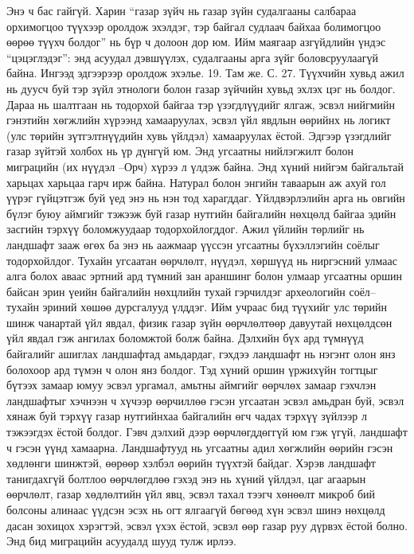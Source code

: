 Энэ ч бас гайгүй. Харин “газар зүйч нь газар зүйн судалгааны салбараа орхимогцоо түүхээр оролдож эхэлдэг, тэр байгал судлаач байхаа болимогцоо өөрөө түүхч болдог” нь бүр ч долоон дор юм. Ийм маягаар азгүйдлийн үндэс “цэцэглэдэг”: энд асуудал дэвшүүлэх, судалгааны арга зүйг боловсруулаагүй байна. Ингээд эдгээрээр оролдож эхэлье. 19. Там же. С. 27.
Түүхчийн хувьд ажил нь дуусч буй тэр зүйл этнологи болон газар зүйчийн хувьд эхлэх цэг нь болдог. Дараа нь шалтгаан нь тодорхой байгаа тэр үзэгдлүүдийг ялгаж, эсвэл нийгмийн гэнэтийн хөгжлийн хүрээнд хамааруулах, эсвэл үйл явдлын өөрийнх нь логикт (улс төрийн зүтгэлтнүүдийн хувь үйлдэл) хамааруулах ёстой. Эдгээр үзэгдлийг газар зүйтэй холбох нь үр дүнгүй юм. Энд угсаатны нийлэгжилт болон миграцийн (их нүүдэл –Орч) хүрээ л үлдэж байна. Энд хүний нийгэм байгальтай харьцах харьцаа гарч ирж байна. Натурал болон энгийн таваарын аж ахуй гол үүрэг гүйцэтгэж буй үед энэ нь нэн тод харагддаг. Үйлдвэрлэлийн арга нь овгийн бүлэг буюу аймгийг тэжээж буй газар нутгийн байгалийн нөхцөлд байгаа эдийн засгийн тэрхүү боломжуудаар тодорхойлогддог.
Ажил үйлийн төрлийг нь ландшафт зааж өгөх ба энэ нь аажмаар үүссэн угсаатны бүхэллэгийн соёлыг тодорхойлдог. Тухайн угсаатан өөрчлөлт, нүүдэл, хөршүүд нь ниргэсний улмаас алга болох аваас эртний ард түмний зан араншинг болон улмаар угсаатны оршин байсан эрин үеийн байгалийн нөхцлийн тухай гэрчилдэг археологийн соёл–тухайн эриний хөшөө дурсгалууд үлддэг. Ийм учраас бид түүхийг улс төрийн шинж чанартай үйл явдал, физик газар зүйн өөрчлөлтөөр давуутай нөхцөлдсөн үйл явдал гэж ангилах боломжтой болж байна.
Дэлхийн бүх ард түмнүүд байгалийг ашиглах ландшафтад амьдардаг, гэхдээ ландшафт нь нэгэнт олон янз болохоор ард түмэн ч олон янз болдог. Тэд хүний оршин үржихүйн тогтцыг бүтээх замаар юмуу эсвэл ургамал, амьтны аймгийг өөрчлөх замаар гэхчлэн ландшафтыг хэчнээн ч хүчээр өөрчиллөө гэсэн угсаатан эсвэл амьдран буй, эсвэл хянаж буй тэрхүү газар нутгийнхаа байгалийн өгч чадах тэрхүү зүйлээр л тэжээгдэх ёстой болдог.
Гэвч дэлхий дээр өөрчлөгддөггүй юм гэж үгүй, ландшафт ч гэсэн үүнд хамаарна. Ландшафтууд нь угсаатны адил хөгжлийн өөрийн гэсэн хөдлөнги шинжтэй, өөрөөр хэлбэл өөрийн түүхтэй байдаг. Хэрэв ландшафт танигдахгүй болтлоо өөрчлөгдлөө гэхэд энэ нь хүний үйлдэл, цаг агаарын өөрчлөлт, газар хөдлөлтийн үйл явц, эсвэл тахал тээгч хөнөөлт микроб бий болсоны алинаас үүдсэн эсэх нь огт ялгаагүй бөгөөд хүн эсвэл шинэ нөхцөлд дасан зохицох хэрэгтэй, эсвэл үхэх ёстой, эсвэл өөр газар руу дүрвэх ёстой болно. Энд бид миграцийн асуудалд шууд тулж ирлээ.
